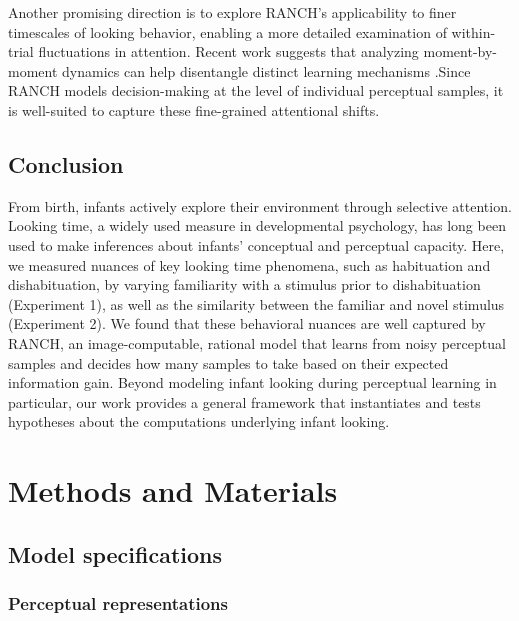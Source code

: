 \documentclass[
]{article}
\begin{document}
Another promising direction is to explore RANCH’s applicability to finer timescales of looking behavior, enabling a more detailed examination of within-trial fluctuations in attention. Recent work suggests that analyzing moment-by-moment dynamics can help disentangle distinct learning mechanisms \autocite{poli2024individual}.Since RANCH models decision-making at the level of individual perceptual samples, it is well-suited to capture these fine-grained attentional shifts.



\hypertarget{conclusion}{%
\subsection{Conclusion}\label{conclusion}}

From birth, infants actively explore their environment through selective attention. Looking time, a widely used measure in developmental psychology, has long been used to make inferences about infants' conceptual and perceptual capacity. Here, we measured nuances of key looking time phenomena, such as habituation and dishabituation, by varying familiarity with a stimulus prior to dishabituation (Experiment 1), as well as the similarity between the familiar and novel stimulus (Experiment 2). We found that these behavioral nuances are well captured by RANCH, an image-computable, rational model that learns from noisy perceptual samples and decides how many samples to take based on their expected information gain. Beyond modeling infant looking during perceptual learning in particular, our work provides a general framework that instantiates and tests hypotheses about the computations underlying infant looking.

\hypertarget{methods-and-materials}{%
\section{Methods and Materials}\label{methods-and-materials}}

\hypertarget{model-specifications}{%
\subsection{Model specifications}\label{model-specifications}}

\hypertarget{perceptual-representations-1}{%
\subsubsection{Perceptual representations}\label{perceptual-representations-1}}
\end{document}
